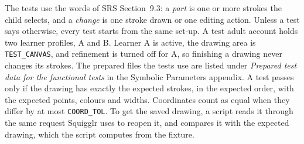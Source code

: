 \documentclass[12pt, titlepage]{article}
\begin{document}
The tests use the words of SRS Section~9.3: a \emph{part} is one or more
strokes the child selects, and a \emph{change} is one stroke drawn or one
editing action. Unless a test says otherwise, every test starts from the same
set-up. A test adult account holds two learner profiles, A and B. Learner A is
active, the drawing area is \texttt{TEST\_CANVAS}, and refinement is turned off for A, so finishing a drawing never
changes its strokes. The prepared files the tests use are listed under
\emph{Prepared test data for the functional tests} in the Symbolic Parameters appendix. A test passes only if the drawing has exactly
the expected strokes, in the expected order, with the expected points, colours
and widths. Coordinates count as equal when they differ by at most
\texttt{COORD\_TOL}. To get the saved drawing, a script reads it through the
same request Squigglr uses to reopen it, and compares it with the expected
drawing, which the script computes from the fixture.
\end{document}
